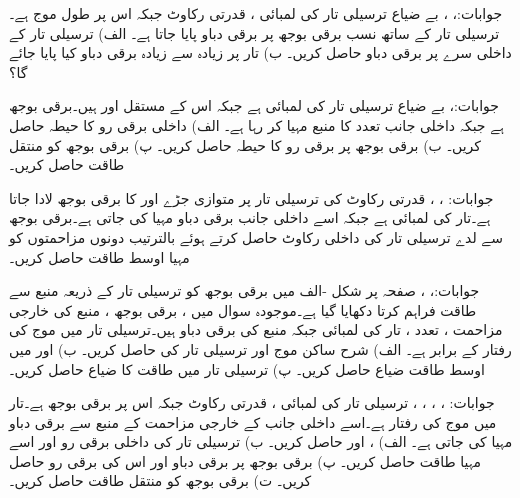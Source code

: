 جوابات:، ، 
بے ضیاع ترسیلی تار کی لمبائی ، قدرتی رکاوٹ  جبکہ اس  پر طول موج  ہے۔ترسیلی تار کے ساتھ نسب برقی بوجھ  پر  برقی دباو پایا جاتا ہے۔ الف) ترسیلی تار کے داخلی سرے پر برقی دباو حاصل کریں۔ ب) تار پر زیادہ سے زیادہ برقی دباو کیا پایا جائے گا؟

جوابات:، 
بے ضیاع ترسیلی تار کی لمبائی  ہے جبکہ اس کے مستقل  اور  ہیں۔برقی بوجھ  ہے جبکہ داخلی جانب  تعدد کا منبع  مہیا کر رہا ہے۔ الف) داخلی برقی رو کا حیطہ حاصل کریں۔ ب) برقی بوجھ پر برقی رو کا حیطہ حاصل کریں۔ پ) برقی بوجھ کو منتقل طاقت حاصل کریں۔

جوابات: ، ، 
 قدرتی رکاوٹ کی ترسیلی تار پر متوازی جڑے  اور  کا برقی بوجھ لادا جاتا ہے۔تار کی لمبائی  ہے جبکہ اسے داخلی جانب  برقی دباو مہیا کی جاتی ہے۔برقی بوجھ سے لدے ترسیلی تار کی داخلی رکاوٹ  حاصل کرتے ہوئے  بالترتیب دونوں مزاحمتوں کو مہیا اوسط طاقت حاصل کریں۔

جوابات:، ، 
صفحہ  پر شکل -الف میں برقی بوجھ کو ترسیلی تار کے ذریعہ منبع سے طاقت فراہم کرتا دکھایا گیا ہے۔موجودہ سوال میں ، برقی  بوجھ ، منبع کی خارجی مزاحمت ، تعدد ، تار کی لمبائی  جبکہ منبع کی برقی دباو  ہیں۔ترسیلی تار میں موج کی رفتار  کے برابر ہے۔ الف) شرح ساکن موج  اور ترسیلی تار کی  حاصل کریں۔ ب)   اور  میں اوسط طاقت ضیاع حاصل کریں۔  پ) ترسیلی تار میں طاقت کا ضیاع حاصل کریں۔   

جوابات: ، ، ، ، 
ترسیلی تار کی لمبائی ، قدرتی رکاوٹ  جبکہ اس پر برقی بوجھ  ہے۔تار میں موج کی رفتار  ہے۔اسے داخلی جانب  کے خارجی مزاحمت کے منبع سے  برقی دباو مہیا کی جاتی ہے۔ الف) ،  اور  حاصل کریں۔ ب) ترسیلی تار کی داخلی برقی رو اور اسے مہیا طاقت حاصل کریں۔ پ)  برقی بوجھ پر برقی دباو اور اس کی برقی رو حاصل کریں۔ ت) برقی بوجھ کو منتقل طاقت حاصل کریں۔

